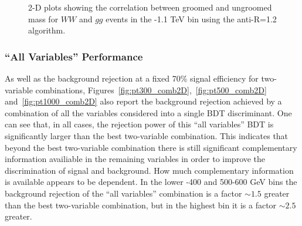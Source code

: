 \begin{figure}
\begin{center}
\caption{2-D plots showing the correlation between groomed and
  ungroomed mass for $WW$ and $gg$ events in the -1.1 TeV bin using the
  anti-\kT R=1.2 algorithm.}
\label{fig:pt1000_2d_masses_AKt_R12}
\end{center}
\end{figure}

\subsubsection{``All Variables'' Performance}\label{sec:Wtagallvars}

As well as the background rejection at a fixed 70\% signal efficiency
for two-variable combinations, Figures~\ref{fig:pt300_comb2D},~\ref{fig:pt500_comb2D}
and~\ref{fig:pt1000_comb2D} also report the background rejection
achieved by a combination of all the variables considered into a
single BDT discriminant. One can see that, in all cases, the rejection
power of this ``all variables'' BDT is significantly larger than the
best two-variable combination. This indicates
that beyond the best two-variable combination there is still
significant complementary information availiable in the remaining
variables in order to improve the discrimination of signal and
background. How much complementary information is available appears to
be \pt dependent. In the lower -400 and 500-600 GeV bins the
background rejection of the ``all variables'' combination is a factor
$\sim 1.5$ greater than the best two-variable combination, but in the
highest \pt bin it is a factor $\sim 2.5$ greater. 

